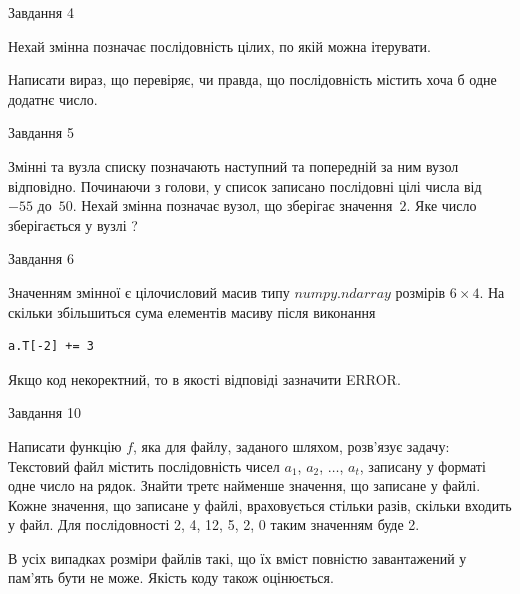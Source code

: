 \documentclass[12pt, ukrainian]{article}
\begin{document}
{               
{\begin{center}Завдання {4}\end{center}}
\vspace{-6mm}
Нехай змінна  позначає послідовність цілих, по якій можна ітерувати.

Написати вираз, що перевіряє, чи правда, що послідовність  містить хоча б одне додатнє число.\par

\vspace{10mm}
               
{\begin{center}Завдання {5}\end{center}}
\vspace{-6mm}
Змінні  та  вузла списку позначають наступний та попередній за ним вузол відповідно. Починаючи з голови, у список записано послідовні цілі числа від~$-55$ до~$50$. Нехай змінна  позначає вузол, що зберігає значення~$2$.
Яке число зберігається у вузлі  ?\par

               
{\begin{center}Завдання {6}\end{center}}
\vspace{-6mm}
Значенням змінної  є цілочисловий масив типу $numpy.ndarray$ розмірів $6{\times}4$. На скільки збільшиться сума елементів масиву  після виконання
\begin{verbatim}
a.T[-2] += 3
\end{verbatim}


Якщо код некоректний, то в якості відповіді зазначити ERROR.\par

               
{\begin{center}Завдання {10}\end{center}}
\vspace{-6mm}

Написати функцію $f$, яка для файлу, заданого шляхом, розв’язує задачу:\\ Текстовий файл містить послідовність чисел $a_1$, $a_2$, $\ldots$, $a_t$, записану у форматі одне число на рядок. Знайти третє найменше значення, що записане у файлі. Кожне значення, що записане у файлі, враховується стільки разів, скільки входить у файл. Для послідовності 2, 4, 12, 5, 2, 0 таким значенням буде 2.

В усіх випадках розміри файлів такі, що їх вміст повністю завантажений у пам'ять бути не може. Якість коду також оцінюється.



}
\end{document}
